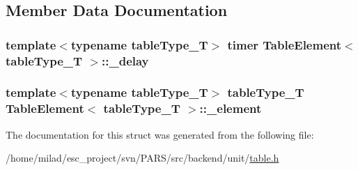 \subsection{Member Data Documentation}
\hypertarget{structTableElement_a360409caa18be13ff49eb33b9761ef51}{
\subsubsection[{\_\-delay}]{\setlength{\rightskip}{0pt plus 5cm}template$<$typename tableType\_\-T$>$ {\bf timer} {\bf TableElement}$<$ tableType\_\-T $>$::{\bf \_\-delay}}}
\label{structTableElement_a360409caa18be13ff49eb33b9761ef51}
\hypertarget{structTableElement_a00a6de9a65467916319e8fd276f8f3f9}{
\subsubsection[{\_\-element}]{\setlength{\rightskip}{0pt plus 5cm}template$<$typename tableType\_\-T$>$ tableType\_\-T {\bf TableElement}$<$ tableType\_\-T $>$::{\bf \_\-element}}}
\label{structTableElement_a00a6de9a65467916319e8fd276f8f3f9}


The documentation for this struct was generated from the following file:\begin{DoxyCompactItemize}
\item 
/home/milad/esc\_\-project/svn/PARS/src/backend/unit/\hyperlink{table_8h}{table.h}\end{DoxyCompactItemize}
